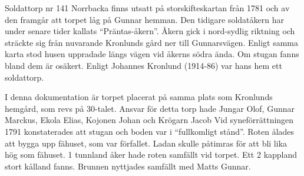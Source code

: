 Soldattorp nr 141 Norrbacka finns utsatt på storskifteskartan från 1781 och av den framgår att torpet låg på Gunnar hemman. Den tidigare soldatåkern har under senare tider kallats ``Präntas-åkern''. Åkern gick i nord-sydlig riktning och sträckte sig från nuvarande Kronlunds gård ner till Gunnarsvägen. Enligt samma karta stod husen uppradade längs vägen vid åkerns södra ända. Om stugan fanns bland dem är osäkert. Enligt Johannes Kronlund (1914-86) var hans hem ett soldattorp.

I denna dokumentation är torpet placerat på samma plats som Kronlunds hemgård, som revs på 30-talet. Ansvar för detta torp hade Jungar Olof, Gunnar Marckus, Ekola Elias, Kojonen Johan och Krögarn Jacob Vid syneförrättningen 1791 konstaterades att stugan och boden var i ``fullkomligt stånd''. Roten ålades att bygga upp fähuset, som var	förfallet. Ladan skulle påtimras för att bli lika hög som fähuset. 1 tunnland åker hade roten samfällt vid torpet. Ett 2 kappland stort kålland fanns. Brunnen nyttjades samfällt med Matts Gunnar.


